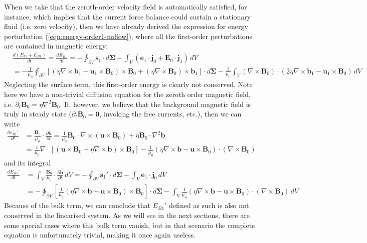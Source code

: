 When we take that the zeroth-order velocity field is automatically satisfied, for instance, which implies that the current force balance could sustain a stationary fluid (i.e. zero velocity), then we have already derived the expression for energy perturbation (\ref{eqn:energy-order1-noflow}), where all the first-order perturbations are contained in magnetic energy:
\[
    \begin{aligned}
        &\frac{d (E_{k1} + E_{B1})}{d t} = \frac{d E_{B1}}{dt} = - \oint_{\partial V} \mathbf{s}_1\cdot d\boldsymbol{\Sigma} - \int_V (\mathbf{e}_1\cdot \mathbf{j}_0 + \mathbf{E}_0\cdot \mathbf{j}_1)\, dV \\ 
        &= - \frac{1}{\mu_0} \oint_{\partial V} \left[(\eta \nabla\times \mathbf{b}_1 - \mathbf{u}_1\times\mathbf{B}_0)\times \mathbf{B}_0 + (\eta\nabla\times \mathbf{B}_0) \times \mathbf{b}_1\right]\cdot d\boldsymbol{\Sigma} - \frac{1}{\mu_0} \int_V (\nabla\times \mathbf{B}_0)\cdot (2\eta\nabla\times \mathbf{b}_1 - \mathbf{u}_1\times \mathbf{B}_0)\, dV
    \end{aligned}
\]
Neglecting the surface term, this first-order energy is clearly not conserved. Note here we have a non-trivial diffusion equation for the zeroth order magnetic field, i.e. $\partial_t \mathbf{B}_0 = \eta \nabla^2 \mathbf{B}_0$. If, however, we believe that the background magnetic field is truly in steady state ($\partial_t \mathbf{B}_0 = \mathbf{0}$, invoking the free currents, etc.), then we can write
%
\[\begin{aligned}
    \frac{\partial \varepsilon_{B1}'}{\partial t} &= \frac{\mathbf{B}_0}{\mu_0} \cdot \frac{\partial \mathbf{b}}{\partial t} = \frac{1}{\mu_0} \mathbf{B}_0 \cdot \nabla\times (\mathbf{u}\times \mathbf{B}_0) + \eta \mathbf{B}_0\cdot \nabla^2 \mathbf{b} \\ 
    &= \frac{1}{\mu_0} \nabla\cdot \left[(\mathbf{u}\times \mathbf{B}_0 - \eta \nabla\times \mathbf{b})\times \mathbf{B}_0\right] - \frac{1}{\mu_0} \left(\eta \nabla\times \mathbf{b} - \mathbf{u}\times \mathbf{B}_0\right) \cdot (\nabla\times \mathbf{B}_0)
\end{aligned}\]
%
and its integral
%
\begin{equation}\begin{aligned}
    \frac{d E_{B1}'}{d t} &= \int_V \frac{\mathbf{B}_0}{\mu_0} \cdot \frac{\partial \mathbf{b}}{\partial t} \, dV = - \oint_{\partial V} \mathbf{s}_1' \cdot d\boldsymbol{\Sigma} - \int_V \mathbf{e}_1\cdot \mathbf{j}_0 \, dV \\
    &= - \oint_{\partial V} \left[\frac{1}{\mu_0}(\eta \nabla\times \mathbf{b} - \mathbf{u}\times \mathbf{B}_0)\times \mathbf{B}_0\right] \cdot d\boldsymbol{\Sigma} - \int_V \frac{1}{\mu_0} \left(\eta \nabla\times \mathbf{b} - \mathbf{u}\times \mathbf{B}_0\right) \cdot (\nabla\times \mathbf{B}_0)\, dV
\end{aligned}\end{equation}
%
Because of the bulk term, we can conclude that $E_{B1}'$ defined as such is also not conserved in the linearised system. As we will see in the next sections, there are some special cases where this bulk term vanish, but in that scenario the complete equation is unfortunately trivial, making it once again useless.
